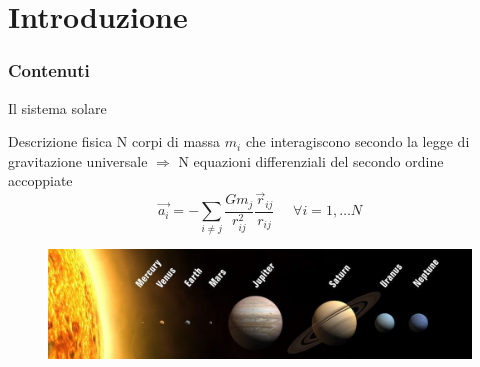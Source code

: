 \section[Intro]{Introduzione}
    \begin{frame}
        \frametitle{Contenuti}
        \transblindsvertical
        \tableofcontents[currentsection]
    \end{frame}


    \begin{frame}{Il sistema solare}
        \begin{block}{Descrizione fisica}
            N corpi di massa $m_i$ che interagiscono secondo la legge di gravitazione universale $\Rightarrow$ N equazioni differenziali del secondo ordine accoppiate
            \\
            \begin{equation}
                \vec{a_i} = -\sum_{i\neq j}\frac{Gm_j}{r_{ij}^2}\frac{\vec r_{ij}}{r_{ij}}\,\,\,\,\,\,\,\,\forall i=1,\dots N
            \end{equation}
        \end{block}
    
        \begin{figure}
            \centering
            \includegraphics[width=\textwidth]{1_intro/siss.png}
        \end{figure}       
    \end{frame}


